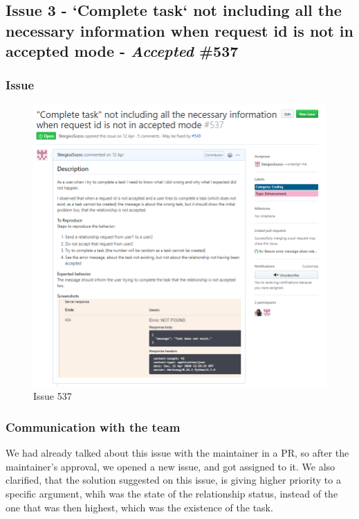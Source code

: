 \documentclass{article}
\begin{document}
\vfill
\clearpage
\subsection{Issue 3 - `Complete task` not including all the necessary information when request id is not in accepted mode - \emph{Accepted} \#537}

\subsubsection{Issue}
\begin{figure}[tph!]
\centerline{\includegraphics[totalheight=15cm, width=16cm]{issue537.png}}
    \caption{Issue 537}
    \label{fig:verticalcell}
\end{figure}

\vfill
\clearpage
\subsubsection{Communication with the team}
We had already talked about this issue with the maintainer in a PR, so after the maintainer's approval, we opened a new issue, and got assigned to it. We also clarified, that the solution suggested on this issue, is giving higher priority to a specific argument, whih was the state of the relationship status, instead of the one that was then highest, which was the existence of the task.
\end{document}
